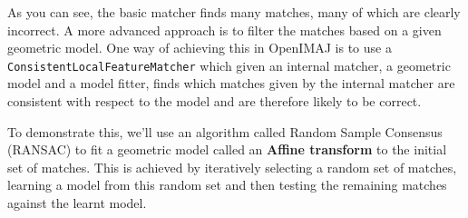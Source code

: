 As you can see, the basic matcher finds many matches, many of which are clearly incorrect. A more advanced 
approach is to filter the matches based on a given geometric model. One way of achieving this in OpenIMAJ 
is to use a \verb+ConsistentLocalFeatureMatcher+ which given an internal matcher, a geometric model and 
a model fitter, finds which matches given by the internal matcher are consistent with respect to the model
and are therefore likely to be correct.

To demonstrate this, we'll use an algorithm called Random Sample Consensus (RANSAC) to fit a geometric model
called an \textbf{Affine transform} to the initial set of matches. This is achieved by iteratively 
selecting a random set of matches, learning a model from this random set and then testing the 
remaining matches against the learnt model. 

